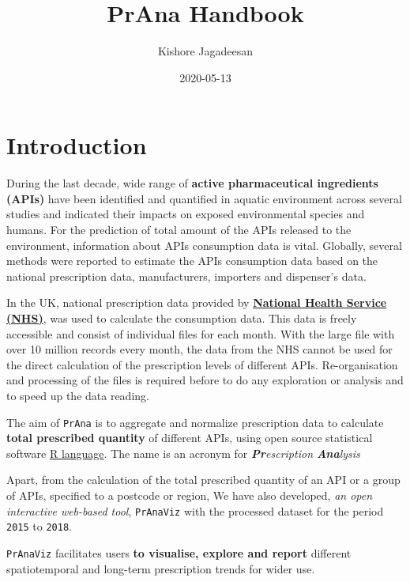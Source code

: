 \documentclass[
]{book}
\title{PrAna Handbook}
\author{Kishore Jagadeesan}
\date{2020-05-13}
\begin{document}
\maketitle

{
\setcounter{tocdepth}{1}
\tableofcontents
}
\hypertarget{introduction}{%
\chapter{Introduction}\label{introduction}}

During the last decade, wide range of \textbf{active pharmaceutical ingredients (APIs)} have been identified and quantified in aquatic environment across several studies and indicated their impacts on exposed environmental species and humans. For the prediction of total amount of the APIs released to the environment, information about APIs consumption data is vital. Globally, several methods were reported to estimate the APIs consumption data based on the national prescription data, manufacturers, importers and dispenser's data.

In the UK, national prescription data provided by \href{https://digital.nhs.uk/organisation-data-service/data-downloads/gp-data}{\textbf{National Health Service (NHS)}}, was used to calculate the consumption data. This data is freely accessible and consist of individual files for each month. With the large file with over 10 million records every month, the data from the NHS cannot be used for the direct calculation of the prescription levels of different APIs. Re-organisation and processing of the files is required before to do any exploration or analysis and to speed up the data reading.

The aim of \texttt{PrAna} is to aggregate and normalize prescription data to calculate \textbf{total prescribed quantity} of different APIs, using open source statistical software \href{https://www.r-project.org/}{R language}. The name is an acronym for \emph{\textbf{Pr}escription \textbf{Ana}lysis}

Apart, from the calculation of the total prescribed quantity of an API or a group of APIs, specified to a postcode or region, We have also developed, \emph{an open interactive web-based tool}, \texttt{PrAnaViz} with the processed dataset for the period \texttt{2015} to \texttt{2018}.

\texttt{PrAnaViz} facilitates users \textbf{to visualise, explore and report} different spatiotemporal and long-term prescription trends for wider use.
\end{document}
